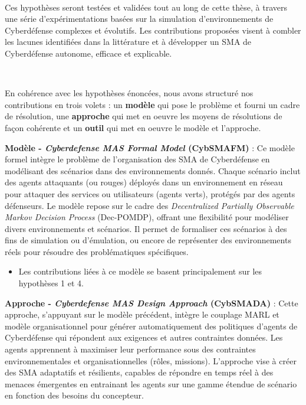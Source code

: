 \

Ces hypothèses seront testées et validées tout au long de cette thèse, à travers une série d’expérimentations basées sur la simulation d’environnements de Cyberdéfense complexes et évolutifs. Les contributions proposées visent à combler les lacunes identifiées dans la littérature et à développer un SMA de Cyberdéfense autonome, efficace et explicable.

\

En cohérence avec les hypothèses énoncées, nous avons structuré nos contributions en trois volets : un \textbf{modèle} qui pose le problème et fourni un cadre de résolution, une \textbf{approche} qui met en oeuvre les moyens de résolutions de façon cohérente et un \textbf{outil} qui met en oeuvre le modèle et l'approche.

\textbf{Modèle - \textit{Cyberdefense MAS Formal Model} (CybSMAFM)} : Ce modèle formel intègre le problème de l’organisation des SMA de Cyberdéfense en modélisant des scénarios dans des environnements donnés. Chaque scénario inclut des agents attaquants (ou rouges) déployés dans un environnement en réseau pour attaquer des services ou utilisateurs (agents verts), protégés par des agents défenseurs. Le modèle repose sur le cadre des \textit{Decentralized Partially Observable Markov Decision Process} (Dec-POMDP), offrant une flexibilité pour modéliser divers environnements et scénarios. Il permet de formaliser ces scénarios à des fins de simulation ou d’émulation, ou encore de représenter des environnements réels pour résoudre des problématiques spécifiques.
\begin{itemize}
    \item Les contributions liées à ce modèle se basent principalement sur les hypothèses 1 et 4.
\end{itemize}

\textbf{Approche - \textit{Cyberdefense MAS Design Approach} (CybSMADA)} : Cette approche, s'appuyant sur le modèle précédent, intègre le couplage MARL et modèle organisationnel pour générer automatiquement des politiques d’agents de Cyberdéfense qui répondent aux exigences et autres contraintes données. Les agents apprennent à maximiser leur performance sous des contraintes environnementales et organisationnelles (rôles, missions). L'approche vise à créer des SMA adaptatifs et résilients, capables de répondre en temps réel à des menaces émergentes en entrainant les agents sur une gamme étendue de scénario en fonction des besoins du concepteur.

